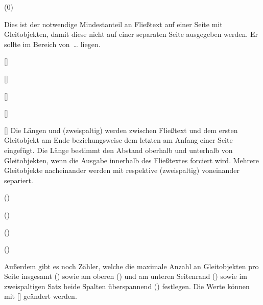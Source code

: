 \begin{Declaration}
  {}
  (0\textfraction)
\printdeclarationlist

Dies ist der notwendige Mindestanteil an Fließtext auf einer Seite mit 
Gleitobjekten, damit diese nicht auf einer separaten Seite ausgegeben werden. 
Er sollte im Bereich von~\dots{} liegen.
\end{Declaration}

\begin{Declaration}{}[\the\textfloatsep]
\begin{Declaration}{}[\the\dbltextfloatsep]
\begin{Declaration}{}[\the\intextsep]
\begin{Declaration}{}[\the\floatsep]
\begin{Declaration}{}[\the\dblfloatsep]
\printdeclarationlist%
%
Die Längen  und  (zweispaltig) 
werden zwischen Fließtext und dem ersten Gleitobjekt am Ende beziehungsweise 
dem letzten am Anfang einer Seite eingefügt. Die Länge  
bestimmt den Abstand oberhalb und unterhalb von Gleitobjekten, wenn die Ausgabe 
innerhalb des Fließtextes forciert wird. Mehrere Gleitobjekte nacheinander 
werden mit  respektive  
(zweispaltig) voneinander separiert.
\end{Declaration}
\end{Declaration}
\end{Declaration}
\end{Declaration}
\end{Declaration}

\begin{Declaration}
  {}
  ()
\begin{Declaration}
  {}
  ()
\begin{Declaration}
  {}
  ()
\begin{Declaration}
  {}
  ()
\printdeclarationlist[Zähler]

Außerdem gibt es noch Zähler, welche die maximale Anzahl an Gleitobjekten pro 
Seite insgesamt () sowie am oberen () 
und am unteren Seitenrand () sowie im zweispaltigen 
Satz beide Spalten überspannend () festlegen. Die Werte 
können mit [] geändert werden.
\end{Declaration}
\end{Declaration}
\end{Declaration}
\end{Declaration}

